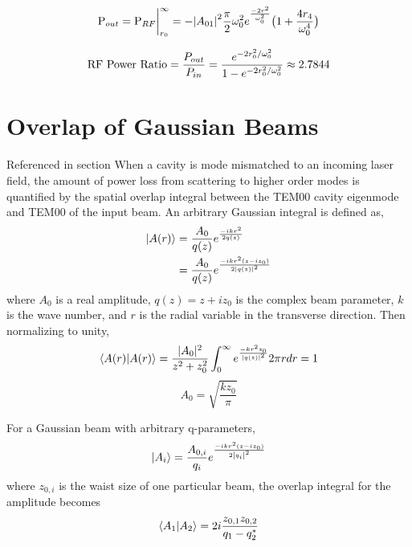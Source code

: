 \begin{appendices}
	\begin{equation}
	\text{P}_{out} \\
	= \text{P}_{RF} \biggr\rvert_{r_0}^{\infty}\\ 
	= - \abs{A_{01}}^2  \frac{\pi}{2} \omega_{0}^2 e^{\frac{-2r^2}{\omega_{0}^2}} \big(1 + \frac{4 r_4}{\omega_{0}^4} \big) 
	\end{equation}
	
	\begin{equation}
	\text{RF Power Ratio} 
	= \frac{P_{out}}{P_{in}} \\
	= \frac{e^{-2r_0^2/ \omega_{0}^2}} {1 - e^{-2r_0^2/ \omega_{0}^2 }} \approx 2.7844
	\end{equation}
	
	\chapter{Overlap of Gaussian Beams}
	
	Referenced in section
	When a cavity is mode mismatched to an incoming laser field, the amount of power loss from scattering to higher order modes is quantified by the spatial overlap integral between the TEM00 cavity eigenmode and TEM00 of the input beam.
	An arbitrary Gaussian integral is defined as,
	\begin{equation}
	\begin{split}
	\ket{A(r)} 
	&= \frac{A_0}{q(z)} e^{\frac{-ikr^2}{2q(z)}}\\
	&= \frac{A_0}{q(z)} e^{\frac{-ikr^2(z-iz_0)}{2\abs{q(z)}^2}}
	\end{split}
	\end{equation}
	where $A_0$ is a real amplitude, $q(z)= z + i z_0$ is the complex beam parameter, $k$ is the wave number, and $r$ is the radial variable in the transverse direction. Then normalizing to unity,
	\begin{equation}
	\braket{A(r)|A(r)} 
	=  \frac{\rvert A_0 \rvert^2}{z^2+z_0^2} \int_{0}^{\infty} e^{\frac{-kr^2 z_0}{\abs{q(z)}^2}} 2 \pi r dr = 1
	\end{equation}
	\begin{equation}
	A_0 = \sqrt{\frac{k z_0}{\pi}}
	\end{equation}

	For a Gaussian beam with arbitrary q-parameters,
	\begin{equation}
	\ket{A_i} = \frac{A_{0,i}}{q_i} e^{ \frac{-ikr^2(z-iz_0)}{2\abs{q_i}^2 }}
	\end{equation}
	where $z_{0,i}$ is the waist size of one particular beam, the overlap integral for the amplitude becomes
	\begin{equation}
	\braket{A_1|A_2} = 2 i  \frac{ z_{0,1}z_{0,2}}{q_1 - q_2^*}
	\end{equation}
	

\end{appendices}
